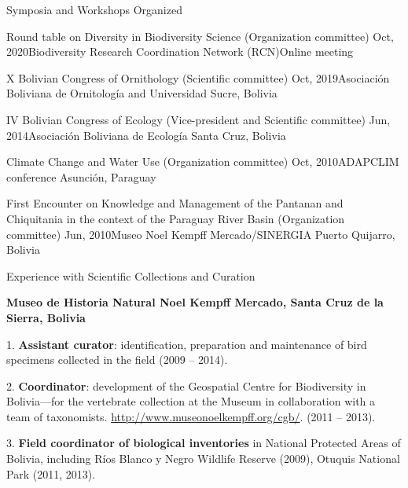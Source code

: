 \documentclass{resume} %
\begin{document}
\begin{rSection}{Symposia and Workshops Organized}

\begin{sSubsection}{Round table on Diversity in Biodiversity Science}{ (Organization committee) }{Oct, 2020}{Biodiversity Research Coordination Network (RCN)}{Online meeting}
\end{sSubsection}

\begin{sSubsection}{X Bolivian Congress of Ornithology }{ (Scientific committee) }{Oct, 2019}{Asociación Boliviana de Ornitología and Universidad }{ Sucre, Bolivia}
\end{sSubsection}

\begin{sSubsection}{IV Bolivian Congress of Ecology }{ (Vice-president and Scientific committee) }{Jun, 2014}{Asociación Boliviana de Ecología }{ Santa Cruz, Bolivia}
\end{sSubsection}

\begin{sSubsection}{Climate Change and Water Use }{ (Organization committee) }{Oct, 2010}{ADAPCLIM conference }{ Asunción, Paraguay}
\end{sSubsection}

\begin{sSubsection}{First Encounter on Knowledge and Management of the Pantanan and Chiquitania in the context of the Paraguay River Basin}{ (Organization committee) }{Jun, 2010}{Museo Noel Kempff Mercado/SINERGIA }{ Puerto Quijarro, Bolivia}
\end{sSubsection}

\end{rSection}

\begin{rSection}{Experience with Scientific Collections and Curation}

\textbf{Museo de Historia Natural Noel Kempff Mercado, Santa Cruz de la Sierra, Bolivia} \smallskip 
\item 1.	\textbf{Assistant curator}: identification, preparation and maintenance of bird specimens collected in the field (2009 – 2014). 
\item 2.	\textbf{Coordinator}: development of the Geospatial Centre for Biodiversity in Bolivia—for the vertebrate collection at the Museum in collaboration with a team of taxonomists. \url{http://www.museonoelkempff.org/cgb/}. (2011 – 2013). 
\item 3.	\textbf{Field coordinator of biological inventories} in National Protected Areas of Bolivia, including Ríos Blanco y Negro Wildlife Reserve (2009), Otuquis National Park (2011, 2013).

\end{rSection}
\end{document}
